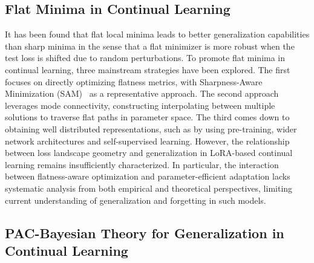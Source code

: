 \documentclass[letterpaper]{article} %
\begin{document}
\subsection{Flat Minima in Continual Learning}
It has been found that flat local minima leads to better generalization capabilities than sharp minima in the sense that a flat minimizer is more robust when the test loss is shifted due to random perturbations. To promote flat minima in continual learning, three mainstream strategies have been explored. The first focuses on directly optimizing flatness metrics, with Sharpness-Aware Minimization (SAM)~\cite{foretSharpnessAwareMinimizationEfficiently2021} as a representative approach. The second approach leverages mode connectivity, constructing interpolating between multiple solutions to traverse flat paths in parameter space. 
The third comes down to obtaining well distributed representations, such as by using pre-training, wider network architectures  and self-supervised learning.
However, the relationship between loss landscape geometry and generalization in LoRA-based continual learning remains insufficiently characterized. In particular, the interaction between flatness-aware optimization and parameter-efficient adaptation lacks systematic analysis from both empirical and theoretical perspectives, limiting current understanding of generalization and forgetting in such models.




\subsection{PAC-Bayesian Theory for Generalization in Continual Learning}
\end{document}

